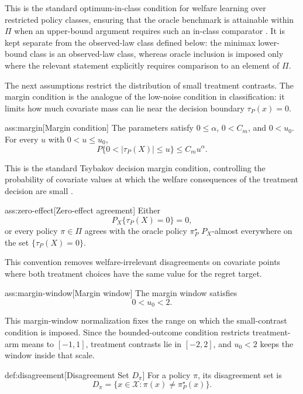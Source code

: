 \documentclass[11pt]{article}
\begin{document}
This is the standard optimum-in-class condition for welfare learning over restricted policy classes, ensuring that the oracle benchmark is attainable within \(\Pi\) when an upper-bound argument requires such an in-class comparator \citep{Kitagawa2018}.  It is kept separate from the observed-law class defined below: the minimax lower-bound class is an observed-law class, whereas oracle inclusion is imposed only where the relevant statement explicitly requires comparison to an element of \(\Pi\).

The next assumptions restrict the distribution of small treatment contrasts.  The margin condition is the analogue of the low-noise condition in classification: it limits how much covariate mass can lie near the decision boundary \(\tau_P(x)=0\).

\begin{assumptionv}{ass:margin}[Margin condition]
The parameters satisfy \(0\le \alpha\), \(0<C_m\), and \(0<u_0\). For every \(u\) with \(0<u\le u_0\),
\[
P\{0<|\tau_P(X)|\le u\}\le C_m u^\alpha .
\]
\end{assumptionv}

This is the standard Tsybakov decision margin condition, controlling the probability of covariate values at which the welfare consequences of the treatment decision are small \citep{Tsybakov2004OptimalAggregation}.

\begin{assumptionv}{ass:zero-effect}[Zero-effect agreement]
Either
\[
P_X\{\tau_P(X)=0\}=0,
\]
or every policy \(\pi\in\Pi\) agrees with the oracle policy \(\pi^\star_P\) \(P_X\)-almost everywhere on the set \(\{\tau_P(X)=0\}\).
\end{assumptionv}

This convention removes welfare-irrelevant disagreements on covariate points where both treatment choices have the same value for the regret target.

\begin{assumptionv}{ass:margin-window}[Margin window]
The margin window satisfies
\[
0<u_0<2.
\]
\end{assumptionv}

This margin-window normalization fixes the range on which the small-contrast condition is imposed.  Since the bounded-outcome condition restricts treatment-arm means to \([-1,1]\), treatment contrasts lie in \([-2,2]\), and \(u_0<2\) keeps the window inside that scale.

\begin{definitionv}{def:disagreement}[Disagreement Set \(D_\pi\)]
For a policy \(\pi\), its disagreement set is
\[
D_\pi=\{x\in\mathcal X:\pi(x)\ne \pi^\star_P(x)\}.
\]
\end{definitionv}
\end{document}
